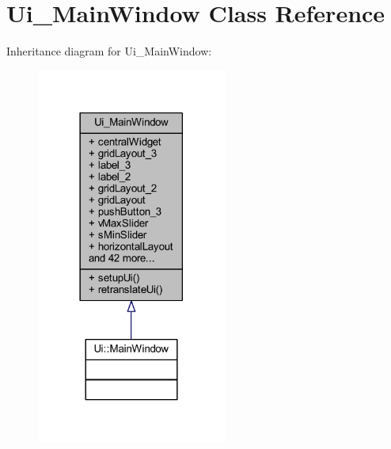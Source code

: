 \hypertarget{class_ui___main_window}{}\section{Ui\+\_\+\+Main\+Window Class Reference}
\label{class_ui___main_window}


Inheritance diagram for Ui\+\_\+\+Main\+Window\+:\nopagebreak
\begin{figure}[H]
\begin{center}
\leavevmode
\includegraphics[width=177pt]{dd/df1/class_ui___main_window__inherit__graph}
\end{center}
\end{figure}


